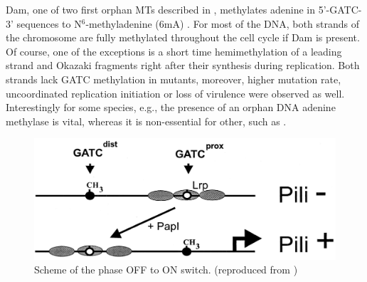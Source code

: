 Dam, one of two first orphan MTs described in , methylates adenine in 5'-GATC-3' sequences to N$^6$-methyladenine (6mA) \cite{marinus1973isolation}.
For most of the DNA, both strands of the chromosome are fully methylated throughout the cell cycle if Dam is present.
Of course, one of the exceptions is a short time hemimethylation of a leading strand and Okazaki fragments right after their synthesis during replication.
Both strands lack GATC methylation in  mutants, moreover, higher mutation rate, uncoordinated replication initiation or loss of virulence were observed as well.
Interestingly for some species, e.g.,  the presence of an orphan DNA adenine methylase is vital, whereas it is non-essential for other, such as  \cite{casadesus2006epigenetic, casadesus2013programmed, adhikari2016dna}.

\begin{figure}[ht!]
  \centering
  \includegraphics[scale=0.3]{text/Pictures/papPili.png}
    \caption{Scheme of the  phase OFF to ON switch. (reproduced from \cite{low2001roles})}
    \label{pap}
\end{figure}

